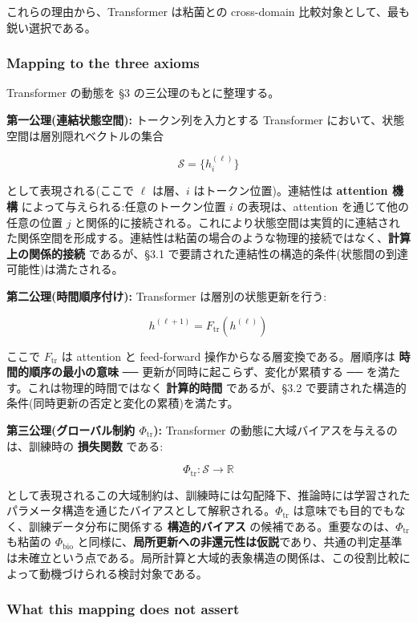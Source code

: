 これらの理由から、Transformer は粘菌との cross-domain 比較対象として、最も鋭い選択である。

\subsubsection{Mapping to the three axioms}


Transformer の動態を \S{}3 の三公理のもとに整理する。

\textbf{第一公理(連結状態空間):}
トークン列を入力とする Transformer において、状態空間は層別隠れベクトルの集合

\[
\mathcal{S} = \{ h^{(\ell)}_i \}
\]

として表現される(ここで $\ell$ は層、$i$ はトークン位置)。連結性は \textbf{attention 機構} によって与えられる:任意のトークン位置 $i$ の表現は、attention を通じて他の任意の位置 $j$ と関係的に接続される。これにより状態空間は実質的に連結された関係空間を形成する。連結性は粘菌の場合のような物理的接続ではなく、\textbf{計算上の関係的接続} であるが、\S{}3.1 で要請された連結性の構造的条件(状態間の到達可能性)は満たされる。

\textbf{第二公理(時間順序付け):}
Transformer は層別の状態更新を行う:

\[
h^{(\ell+1)} = F_\text{tr}\!\left( h^{(\ell)} \right)
\]

ここで $F_\text{tr}$ は attention と feed-forward 操作からなる層変換である。層順序は \textbf{時間的順序の最小の意味} ── 更新が同時に起こらず、変化が累積する ── を満たす。これは物理的時間ではなく \textbf{計算的時間} であるが、\S{}3.2 で要請された構造的条件(同時更新の否定と変化の累積)を満たす。

\textbf{第三公理(グローバル制約 $\Phi_\text{tr}$):}
Transformer の動態に大域バイアスを与えるのは、訓練時の \textbf{損失関数} である:

\[
\Phi_\text{tr} : \mathcal{S} \to \mathbb{R}
\]

として表現されるこの大域制約は、訓練時には勾配降下、推論時には学習されたパラメータ構造を通じたバイアスとして解釈される。$\Phi_\text{tr}$ は意味でも目的でもなく、訓練データ分布に関係する \textbf{構造的バイアス} の候補である。重要なのは、$\Phi_\text{tr}$ も粘菌の $\Phi_\text{bio}$ と同様に、\textbf{局所更新への非還元性は仮説}であり、共通の判定基準は未確立という点である。局所計算と大域的表象構造の関係は、この役割比較によって動機づけられる検討対象である。

\subsubsection{What this mapping does not assert}


